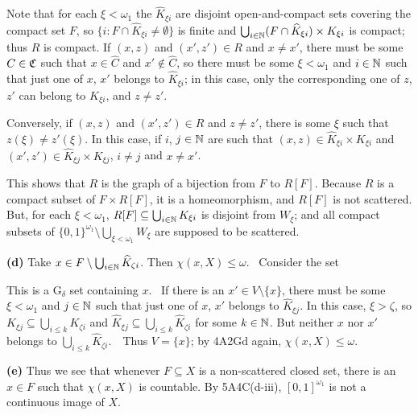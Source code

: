 {\noindent Note that for each $\xi<\omega_1$ the $\widehat{K}_{\xi i}$
are disjoint open-and-compact sets covering the compact set $F$, so
$\{i:F\cap\widehat{K}_{\xi i}\ne\emptyset\}$ is finite and
$\bigcup_{i\in\Bbb N}(F\cap\widehat{K}_{\xi i})\times K_{\xi i}$ is
compact;  thus $R$ is compact.   If $(x,z)$ and $(x',z')\in R$ and
$x\ne x'$, there must be some $C\in\frak C$ such that $x\in\widehat{C}$
and $x'\notin\widehat{C}$, so there must be some $\xi<\omega_1$ and
$i\in\Bbb N$ such that
just one of $x$, $x'$ belongs to $\widehat{K}_{\xi i}$;  in this case,
only the corresponding one of $z$, $z'$ can belong to $K_{\xi i}$, and
$z\ne z'$.

Conversely, if $(x,z)$ and $(x',z')\in R$ and $z\ne z'$, there is some
$\xi$ such that $z(\xi)\ne z'(\xi)$.   In this case, if $i$,
$j\in\Bbb N$ are such that $(x,z)\in\widehat{K}_{\xi i}\times K_{\xi i}$
and $(x',z')\in\widehat{K}_{\xi j}\times K_{\xi j}$, $i\ne j$ and
$x\ne x'$.

This shows that $R$ is the graph of a bijection from $F$ to $R[F]$.
Because $R$ is a compact subset of $F\times R[F]$, it is a
homeomorphism, and $R[F]$ is not scattered.   But, for each
$\xi<\omega_1$,
$R[F]\subseteq\bigcup_{i\in\Bbb N}K_{\xi i}$ is disjoint from $W_{\xi}$;
and all compact subsets of
$\{0,1\}^{\omega_1}\setminus\bigcup_{\xi<\omega_1}W_{\xi}$ are supposed
to be scattered.\ \Bang\Qed

\medskip

{\bf (d)} Take
$x\in F\setminus\bigcup_{i\in\Bbb N}\widehat{K}_{\zeta i}$.   Then
$\chi(x,X)\le\omega$.   \Prf\ Consider the set


\noindent This is a G$_{\delta}$ set containing $x$.   \Quer\ If there
is an $x'\in V\setminus\{x\}$, there must be some $\xi<\omega_1$ and
$j\in\Bbb N$ such that just one of $x$, $x'$ belongs to
$\widehat{K}_{\xi j}$.   In this case, $\xi>\zeta$, so
$K_{\xi j}\subseteq\bigcup_{i\le k}K_{\zeta i}$ and
$\widehat{K}_{\xi j}\subseteq\bigcup_{i\le k}\widehat{K}_{\zeta i}$ for
some $k\in\Bbb N$.
But neither $x$ nor $x'$ belongs to
$\bigcup_{i\le k}\widehat{K}_{\zeta i}$.\ \BanG\   Thus $V=\{x\}$;  by
4A2Gd again, $\chi(x,X)\le\omega$.\ \Qed

\medskip

{\bf (e)} Thus we see that whenever $F\subseteq X$ is a non-scattered
closed set, there is an $x\in F$ such that $\chi(x,X)$ is countable.
By 5A4C(d-iii), $[0,1]^{\omega_1}$ is not a continuous image of $X$.
}%

